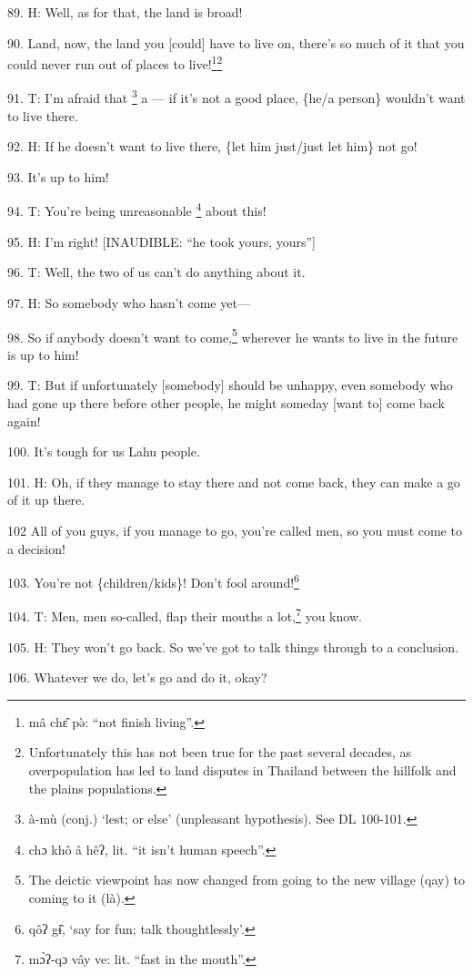 89. H: Well, as for that, the land is broad!

90. Land, now, the land you [could] have to live on, there's so much of it that
you could never run out of places to live!\footnote{mâ chɛ̂ pə̀: ``not finish living''.}\footnote{Unfortunately this has not been true for the past several decades, as overpopulation has led to land disputes in Thailand between the hillfolk and the plains populations.}

91. T: I'm afraid that \footnote{à-mù (conj.) `lest; or else' (unpleasant hypothesis). See DL 100-101.} a --- if it's not a good place, \{he/a person\} wouldn't
want to live there.

92. H: If he doesn't want to live there, \{let him just/just let him\} not go!

93. It's up to him!

94. T: You're being unreasonable \footnote{chɔ khô â hêʔ, lit. ``it isn't human speech''.} about this!

95. H: I'm right! [INAUDIBLE: ``he took yours, yours'']

96. T: Well, the two of us can't do anything about it.

97. H: So somebody who hasn't come yet---

98. So if anybody doesn't want to come,\footnote{The deictic viewpoint has now changed from going to the new village (qay) to coming to it (là).} wherever he wants to live in the future
is up to him!

99. T: But if unfortunately [somebody] should be unhappy, even somebody who had
gone up there before other people, he might someday [want to] come back again!

100. It's tough for us Lahu people.

101. H: Oh, if they manage to stay there and not come back, they can make a go
of it up there.

102 All of you guys, if you manage to go, you're called men, so you must come to
a decision!

103. You're not \{children/kids\}! Don't fool around!\footnote{qôʔ gɨ̂, `say for fun; talk thoughtlessly'.}

104. T: Men, men so-called, flap their mouths a lot,\footnote{mɔ̀ʔ-qɔ vây ve: lit. ``fast in the mouth''.} you know.

105. H: They won't go back. So we've got to talk things through to a conclusion.

106. Whatever we do, let's go and do it, okay?

